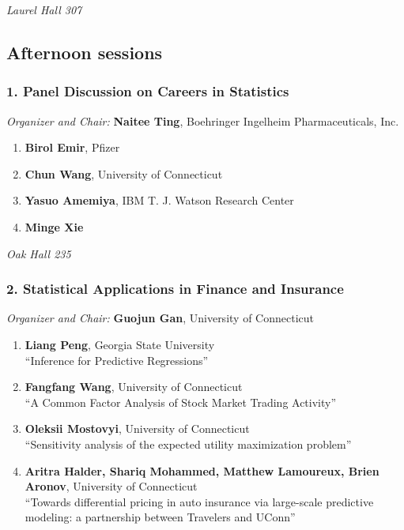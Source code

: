 \emph{Laurel Hall 307} \\[.5em]

\subsection*{Afternoon sessions}

\subsubsection*{1. Panel Discussion on Careers in Statistics}

\emph{Organizer and Chair:} \textbf{Naitee Ting}, Boehringer Ingelheim Pharmaceuticals, Inc.

\begin{enumerate}
\item \textbf{Birol Emir}, Pfizer 
\item \textbf{Chun Wang}, University of Connecticut 
\item \textbf{Yasuo Amemiya}, IBM T. J. Watson Research Center 
\item \textbf{Minge Xie} 
\end{enumerate}

\emph{Oak Hall 235} \\[.5em]

\subsubsection*{2. Statistical Applications in Finance and Insurance}

\emph{Organizer and Chair:} \textbf{Guojun Gan}, University of Connecticut

\begin{enumerate}
\item \textbf{Liang Peng}, Georgia State University \\
``Inference for Predictive Regressions''
\item \textbf{Fangfang Wang}, University of Connecticut \\
``A Common Factor Analysis of  Stock Market Trading Activity''
\item \textbf{Oleksii Mostovyi}, University of Connecticut \\
``Sensitivity analysis of the expected utility maximization problem''
\item \textbf{Aritra Halder, Shariq Mohammed, Matthew Lamoureux, Brien Aronov}, University of Connecticut \\
``Towards differential pricing in auto insurance via large-scale predictive modeling: a partnership between Travelers and UConn''
\end{enumerate}

